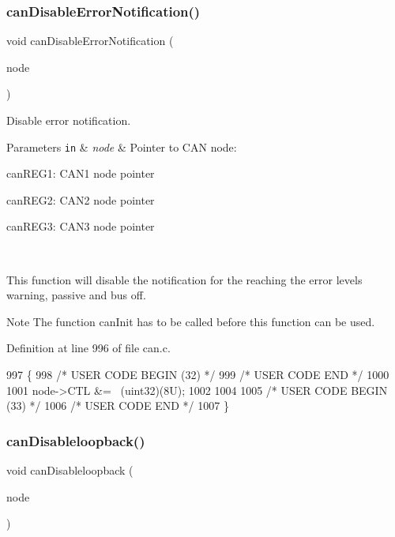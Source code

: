 \subsubsection{\texorpdfstring{can\+Disable\+Error\+Notification()}{canDisableErrorNotification()}}
{\footnotesize\ttfamily void can\+Disable\+Error\+Notification (\begin{DoxyParamCaption}\item[{\mbox{\hyperlink{reg__can_8h_a54ace0879c28a425474845a63d662c05}{can\+B\+A\+S\+E\+\_\+t}} $\ast$}]{node }\end{DoxyParamCaption})}



Disable error notification. 


\begin{DoxyParams}[1]{Parameters}
\mbox{\tt in}  & {\em node} & Pointer to C\+AN node\+:
\begin{DoxyItemize}
\item can\+R\+E\+G1\+: C\+A\+N1 node pointer
\item can\+R\+E\+G2\+: C\+A\+N2 node pointer
\item can\+R\+E\+G3\+: C\+A\+N3 node pointer
\end{DoxyItemize}\\
\hline
\end{DoxyParams}
This function will disable the notification for the reaching the error levels warning, passive and bus off. \begin{DoxyNote}{Note}
The function can\+Init has to be called before this function can be used. 
\end{DoxyNote}


Definition at line 996 of file can.\+c.


\begin{DoxyCode}
997 \{
998 \textcolor{comment}{/* USER CODE BEGIN (32) */}
999 \textcolor{comment}{/* USER CODE END */}
1000 
1001     node->CTL &= ~(uint32)(8U);
1002 
1004 
1005 \textcolor{comment}{/* USER CODE BEGIN (33) */}
1006 \textcolor{comment}{/* USER CODE END */}
1007 \}
\end{DoxyCode}
\mbox{\label{group__CAN_ga965046b34f4e45c97de1d08c2ba73cb4}} 
\subsubsection{\texorpdfstring{can\+Disableloopback()}{canDisableloopback()}}
{\footnotesize\ttfamily void can\+Disableloopback (\begin{DoxyParamCaption}\item[{\mbox{\hyperlink{reg__can_8h_a54ace0879c28a425474845a63d662c05}{can\+B\+A\+S\+E\+\_\+t}} $\ast$}]{node }\end{DoxyParamCaption})}



